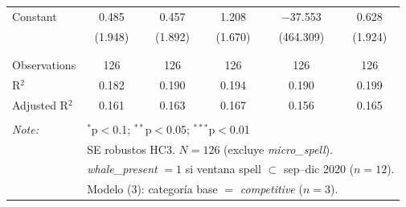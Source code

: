\begin{table}[!htbp]
\begin{tabular}{@{\extracolsep{5pt}}lccccc}
 Constant & 0.485 & 0.457 & 1.208 & $-$37.553 & 0.628 \\ 
  & (1.948) & (1.892) & (1.670) & (464.309) & (1.924) \\ 
  & & & & & \\ 
\hline \\[-1.8ex] 
Observations & 126 & 126 & 126 & 126 & 126 \\ 
R$^{2}$ & 0.182 & 0.190 & 0.194 & 0.190 & 0.199 \\ 
Adjusted R$^{2}$ & 0.161 & 0.163 & 0.167 & 0.156 & 0.165 \\ 
\hline 
\hline \\[-1.8ex] 
\textit{Note:}  & \multicolumn{5}{l}{$^{*}$p$<$0.1; $^{**}$p$<$0.05; $^{***}$p$<$0.01} \\ 
 & \multicolumn{5}{l}{SE robustos HC3. $N=126$ (excluye \textit{micro\_spell}).} \\ 
 & \multicolumn{5}{l}{\textit{whale\_present} $= 1$ si ventana spell $\subset$ sep--dic 2020 ($n=12$).} \\ 
 & \multicolumn{5}{l}{Modelo (3): categoría base $=$ \textit{competitive} ($n=3$).} \\ 
\end{tabular} 
\end{table} 
